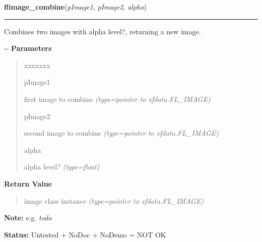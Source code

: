     \label{xformslib:flflimage:flimage_combine}

    \vspace{0.5ex}

\hspace{.8\funcindent}\begin{boxedminipage}{\funcwidth}

    \raggedright \textbf{flimage\_combine}(\textit{pImage1}, \textit{pImage2}, \textit{alpha})

    \vspace{-1.5ex}

    \rule{\textwidth}{0.5\fboxrule}
\setlength{\parskip}{2ex}

Combines two images with alpha level?, returning a new image.

-{}-
\setlength{\parskip}{1ex}
      \textbf{Parameters}
      \vspace{-1ex}

      \begin{quote}
        \begin{Ventry}{xxxxxxx}

          \item[pImage1]


first image to combine
            {\it (type=pointer to xfdata.FL\_IMAGE)}

          \item[pImage2]


second image to combine
            {\it (type=pointer to xfdata.FL\_IMAGE)}

          \item[alpha]


alpha level?
            {\it (type=float)}

        \end{Ventry}

      \end{quote}

      \textbf{Return Value}
    \vspace{-1ex}

      \begin{quote}

image class instance
      {\it (type=pointer to xfdata.FL\_IMAGE)}

      \end{quote}

\textbf{Note:} 
e.g. \emph{todo}


\textbf{Status:} 
Untested + NoDoc + NoDemo = NOT OK


    \end{boxedminipage}

